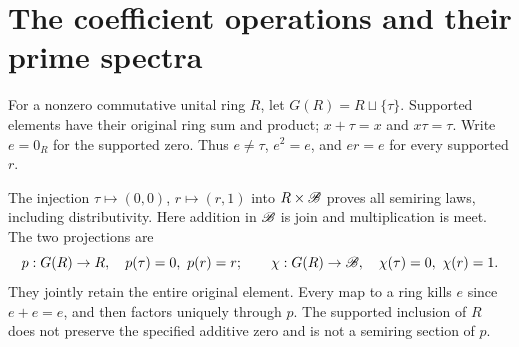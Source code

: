 \section{The coefficient operations and their prime spectra}
\label{sec:rebuilt-spectra}
\begin{definition}
For a nonzero commutative unital ring $R$, let $G(R)=R\sqcup\{\tau\}$. Supported elements have their original ring sum and product; $x+\tau=x$ and $x\tau=\tau$. Write $e=0_R$ for the supported zero. Thus $e\ne\tau$, $e^2=e$, and $er=e$ for every supported $r$.
\end{definition}
The injection $\tau\mapsto(0,0)$, $r\mapsto(r,1)$ into $R\times\mathscr B$ proves all semiring laws, including distributivity. Here addition in $\mathscr B$ is join and multiplication is meet. The two projections are
\begin{equation}\label{eq:base-two-maps}
 p:G(R)\to R,\quad p(\tau)=0,\ p(r)=r;
 \qquad \chi:G(R)\to\mathscr B,\quad\chi(\tau)=0,\ \chi(r)=1.
\end{equation}
They jointly retain the entire original element. Every map to a ring kills $e$ since $e+e=e$, and then factors uniquely through $p$. The supported inclusion of $R$ does not preserve the specified additive zero and is not a semiring section of $p$.


